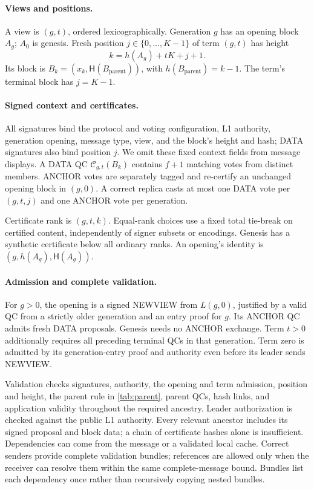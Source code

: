 \documentclass[11pt,a4paper]{article}
\newcommand{\QC}{\mathcal C}
\newcommand{\Hash}{\mathsf H}
\newcounter{protocol}
\begin{document}
\paragraph{Views and positions.}
A view is $(g,t)$, ordered lexicographically. Generation $g$ has an
opening block $A_g$; $A_0$ is genesis. Fresh position $j\in\{0,\ldots,K-1\}$
of term $(g,t)$ has height
\[
 k=h(A_g)+tK+j+1.
\]
Its block is $B_k=(x_k,\Hash(B_{\mathrm{parent}}))$, with
$h(B_{\mathrm{parent}})=k-1$. The term's terminal block has $j=K-1$.

\paragraph{Signed context and certificates.}
All signatures bind the protocol and voting configuration, L1 authority,
generation opening, message type, view, and the block's height and hash;
DATA signatures also bind position $j$. We omit these fixed context fields
from message displays. A DATA QC $\QC_{g,t}(B_k)$ contains $f+1$ matching
votes from distinct members. ANCHOR votes are separately tagged and
re-certify an unchanged opening block in $(g,0)$. A correct replica casts
at most one DATA vote per $(g,t,j)$ and one ANCHOR vote per generation.

Certificate rank is $(g,t,k)$. Equal-rank choices use a fixed total
tie-break on certified content, independently of signer subsets or
encodings. Genesis has a synthetic certificate below all ordinary ranks.
An opening's identity is $(g,h(A_g),\Hash(A_g))$.

\paragraph{Admission and complete validation.}
For $g>0$, the opening is a signed NEWVIEW from $L(g,0)$, justified by
a valid QC from a strictly older generation and an entry proof for $g$.
Its ANCHOR QC admits fresh DATA proposals. Genesis needs no ANCHOR exchange.
Term $t>0$ additionally requires all preceding terminal QCs in that
generation. Term zero is admitted by its generation-entry proof and
authority even before its leader sends NEWVIEW.

Validation checks signatures, authority, the opening and term admission,
position and height, the parent rule in \cref{tab:parent}, parent QCs,
hash links, and application validity throughout the required ancestry.
Leader authorization is checked against the public L1 authority.
Every relevant ancestor includes its signed proposal and block data;
a chain of certificate hashes alone is insufficient. Dependencies can
come from the message or a validated local cache. Correct senders provide
complete validation bundles; references are allowed only when the receiver
can resolve them within the same complete-message bound. Bundles list
each dependency once rather than recursively copying nested bundles.
\end{document}
